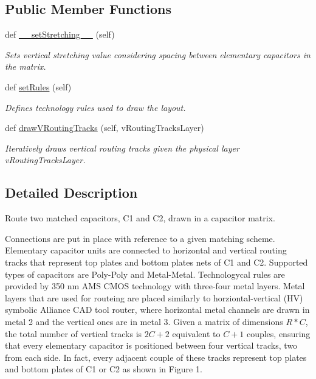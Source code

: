 \subsection*{Public Member Functions}
\begin{DoxyCompactItemize}
\item 
def \mbox{\hyperlink{classpython_1_1capacitorvrtracks_1_1VerticalRoutingTracks_a0196828def1b7ed08eb1bfe027cf4692}{\+\_\+\+\_\+set\+Stretching\+\_\+\+\_\+}} (self)
\begin{DoxyCompactList}\small\item\em Sets vertical stretching value considering spacing between elementary capacitors in the matrix. \end{DoxyCompactList}\item 
def \mbox{\hyperlink{classpython_1_1capacitorvrtracks_1_1VerticalRoutingTracks_a458149b1404a0e797668330beb75b640}{set\+Rules}} (self)
\begin{DoxyCompactList}\small\item\em Defines technology rules used to draw the layout. \end{DoxyCompactList}\item 
def \mbox{\hyperlink{classpython_1_1capacitorvrtracks_1_1VerticalRoutingTracks_ade479990eba75cc3c94fba25082a4b28}{draw\+V\+Routing\+Tracks}} (self, v\+Routing\+Tracks\+Layer)
\begin{DoxyCompactList}\small\item\em Iteratively draws vertical routing tracks given the physical layer {\ttfamily v\+Routing\+Tracks\+Layer}. \end{DoxyCompactList}\end{DoxyCompactItemize}


\subsection{Detailed Description}
Route two matched capacitors, C1 and C2, drawn in a capacitor matrix. 

Connections are put in place with reference to a given matching scheme. Elementary capacitor units are connected to horizontal and vertical routing tracks that represent top plates and bottom plates nets of C1 and C2. Supported types of capacitors are Poly-\/\+Poly and Metal-\/\+Metal. Technologycal rules are provided by 350 nm A\+MS C\+M\+OS technology with three-\/four metal layers. Metal layers that are used for routeing are placed similarly to horziontal-\/vertical (HV) symbolic Alliance C\+AD tool router, where horizontal metal channels are drawn in metal 2 and the vertical ones are in metal 3. Given a matrix of dimensions $ R*C $, the total number of vertical tracks is $ 2C+2 $ equivalent to $ C+1 $ couples, ensuring that every elementary capacitor is positioned between four vertical tracks, two from each side. In fact, every adjacent couple of these tracks represent top plates and bottom plates of C1 or C2 as shown in Figure 1.



